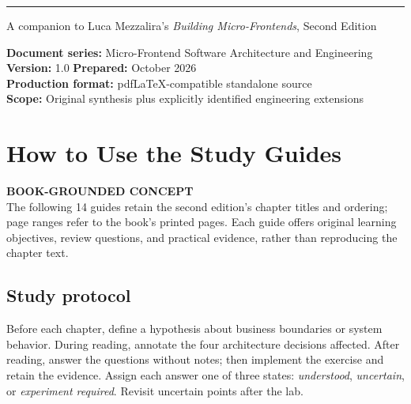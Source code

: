 \documentclass[11pt,letterpaper,oneside]{report}
\newcommand{\based}[1]{\begin{sourcebox}\textbf{BOOK-GROUNDED CONCEPT}\\#1\end{sourcebox}}
\begin{document}
\hypersetup{pageanchor=false}%
\begin{titlepage}\thispagestyle{empty}
\vspace{27pt}\noindent\color{blue}\rule{0.75\textwidth}{1.4pt}
\vspace{23pt}\par{\large\sffamily A companion to Luca Mezzalira's \emph{Building Micro-Frontends}, Second Edition}\par
\vfill\noindent\textbf{Document series:} Micro-Frontend Software Architecture and Engineering\\
\textbf{Version:} 1.0 \quad \textbf{Prepared:} October 2026\\
\textbf{Production format:} pdfLaTeX-compatible standalone source\\
\textbf{Scope:} Original synthesis plus explicitly identified engineering extensions
\end{titlepage}\hypersetup{pageanchor=true}
\tableofcontents\clearpage{}
\chapter*{How to Use the Study Guides}
\based{The following 14 guides retain the second edition's chapter titles and ordering; page ranges refer to the book's printed pages. Each guide offers original learning objectives, review questions, and practical evidence, rather than reproducing the chapter text.}
\section*{Study protocol}
Before each chapter, define a hypothesis about business boundaries or system behavior. During reading, annotate the four architecture decisions affected. After reading, answer the questions without notes; then implement the exercise and retain the evidence. Assign each answer one of three states: \emph{understood}, \emph{uncertain}, or \emph{experiment required}. Revisit uncertain points after the lab.
\end{document}
